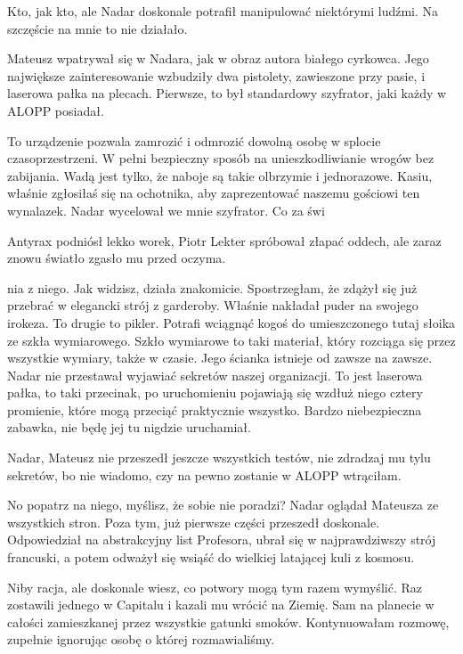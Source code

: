 Kto, jak kto, ale Nadar doskonale potrafił manipulować niektórymi ludźmi.
Na szczęście na mnie to nie działało.

Mateusz wpatrywał się w Nadara, jak w obraz autora białego cyrkowca.
Jego największe zainteresowanie wzbudziły dwa pistolety, zawieszone przy pasie, i laserowa pałka na plecach.
Pierwsze, to był standardowy szyfrator, jaki każdy w ALOPP posiadał.

\ds{} To urządzenie pozwala zamrozić i odmrozić dowolną osobę w splocie czasoprzestrzeni.
W pełni bezpieczny sposób na unieszkodliwianie wrogów bez zabijania.
Wadą jest tylko, że naboje są takie olbrzymie i jednorazowe.
Kasiu, właśnie zgłosiłaś się na ochotnika, aby zaprezentować naszemu gościowi ten wynalazek. \dm{} Nadar wycelował we mnie szyfrator. Co za świ

\divider{}

Antyrax podniósł lekko worek, Piotr Lekter spróbował złapać oddech, ale zaraz znowu światło zgasło mu przed oczyma.

\divider{}

nia z niego. \de{}
\ds{} Jak widzisz, działa znakomicie. \dm{} Spostrzegłam, że zdążył się już przebrać w elegancki strój z garderoby. Właśnie nakładał puder na swojego irokeza. \dm{}
To drugie to pikler. Potrafi wciągnąć kogoś do umieszczonego tutaj słoika ze szkła wymiarowego.
Szkło wymiarowe to taki materiał, który rozciąga się przez wszystkie wymiary, także w czasie. Jego ścianka istnieje od zawsze na zawsze. \dm{}
Nadar nie przestawał wyjawiać sekretów naszej organizacji. \dm{}
To jest laserowa pałka, to taki przecinak, po uruchomieniu pojawiają się wzdłuż niego cztery promienie, które mogą przeciąć praktycznie wszystko. 
Bardzo niebezpieczna zabawka, nie będę jej tu nigdzie uruchamiał. \de{}

\ds{} Nadar, Mateusz nie przeszedł jeszcze wszystkich testów, nie zdradzaj mu tylu sekretów, bo nie wiadomo, czy na pewno zostanie w ALOPP \dm{}
wtrąciłam. \de{}

\ds{} No popatrz na niego, myślisz, że sobie nie poradzi? \dm{} Nadar oglądał Mateusza ze wszystkich stron. \dm{} 
Poza tym, już pierwsze części przeszedł doskonale. Odpowiedział na abstrakcyjny list Profesora, ubrał się w najprawdziwszy strój francuski, a potem 
odważył się wsiąść do wielkiej latającej kuli z kosmosu. \de{}

\ds{} Niby racja, ale doskonale wiesz, co potwory mogą tym razem wymyślić. Raz zostawili jednego w Capitalu i kazali mu wrócić na Ziemię.
Sam na planecie w całości zamieszkanej przez wszystkie gatunki smoków. \dm{} Kontynuowałam rozmowę, zupełnie ignorując osobę o której rozmawialiśmy. \de{}

